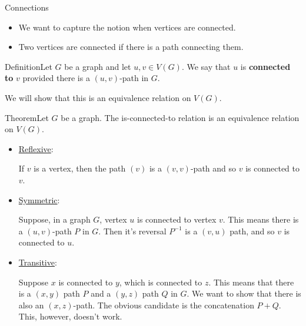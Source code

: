 \documentclass{beamer}
\def\bl[#1]#2{\begin{block}{#1}#2\end{block}}
\def\itemb{\begin{itemize}}
\def\iteme{\end{itemize}}
\begin{document}
\begin{frame}{Connections}
\itemb
\item We want to capture the notion when vertices are connected.
\item Two vertices are connected if there is a path connecting them. 
\iteme
\bl[Definition]{Let $G$ be a graph and let $u,v\in V(G)$. We say that $u$ is \textbf{connected to} $v$ provided there is a $(u,v)$-path in $G$.}
\center We will show that this is an equivalence relation on $V(G)$.
\end{frame}

\begin{frame}
\bl[Theorem]{Let $G$ be a graph. The is-connected-to relation is an equivalence relation on $V(G)$.}
\itemb
\item \underline{Reflexive}:

If $v$ is a vertex, then the path $(v)$ is a $(v,v)$-path and so $v$ is connected to $v$.

\item \underline{Symmetric}:

Suppose, in a graph $G$, vertex $u$ is connected to vertex $v$. This means there is a $(u,v)$-path $P$ in $G$. Then it's reversal $P^{-1}$ is a $(v,u)$ path, and so $v$ is connected to $u$.
\item \underline{Transitive}:

Suppose $x$ is connected to $y$, which is connected to $z$. This means that there is a $(x,y)$ path $P$ and a $(y,z)$ path $Q$ in $G$. We want to show that there is also an $(x,z)$-path. The obvious candidate is the concatenation $P+Q$. 
\center This, however, doesn't work.
\iteme
\end{frame}
\end{document}
